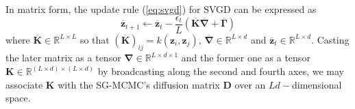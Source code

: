 In matrix form, the update rule (\ref{eq:svgd}) for SVGD can be expressed as
\begin{equation}\label{eq:svgd_mat}
\overline{\bm{z}}_{t+1} \leftarrow \overline{\bm{z}}_t -\frac{\epsilon_t}{L}\left( \overline{\mathbf{K}} \overline{\mathbf{\nabla}} + \overline{\mathbf{\Gamma}} \right)
\end{equation}
where $\overline{\mathbf{K}} \in \mathbb{R}^{L \times L}$ so that $(\overline{\mathbf{K}})_{ij} = k(\bm{z}_i, \bm{z}_j)$, $\overline{\mathbf{\nabla}} \in \mathbb{R}^{L\times d}$ and $\overline{\bm{z}}_t \in \mathbb{R}^{L\times d}$. Casting the later matrix as a tensor $\mathbf{\nabla} \in \mathbb{R}^{L \times d \times 1}$ and the former one as a tensor $\mathbf{K} \in \mathbb{R}^{(L \times d) \times (L \times d)}$ by broadcasting along the second and fourth axes, we may associate $\mathbf{K}$ with the SG-MCMC's diffusion matrix $\mathbf{D}$ over an $Ld-$dimensional space. 

